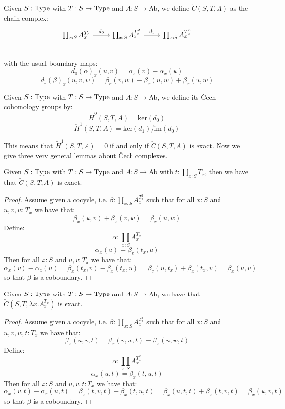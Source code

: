 \begin{definition}
Given $S:\mathrm{Type}$ with $T:S\to \mathrm{Type}$ and $A:S\to\mathrm{Ab}$, we define $\check{C}(S,T,A)$ as the chain complex:
\begin{equation}
\begin{tikzcd}
     \prod_{x:S}A_x^{T_x} \ar[r,"d_0"] & \prod_{x:S}A_x^{T_x^2}\ar[r,"d_1"] &  \prod_{x:S}A_x^{T_x^3}\\
\end{tikzcd}
\end{equation}
with the usual boundary maps:
\[d_0(\alpha)_x(u,v) = \alpha_x(v)-\alpha_x(u)\]
\[d_1(\beta)_x(u,v,w) = \beta_x(v,w) - \beta_x(u,w) + \beta_x(u,w)\]
\end{definition}

\begin{definition}
Given $S:\mathrm{Type}$ with $T:S\to \mathrm{Type}$ and $A:S\to\mathrm{Ab}$, we define its \v{C}ech cohomology groups by:
\[\check{H}^0(S,T,A) = \mathrm{ker}(d_0)\]
\[\check{H}^1(S,T,A) = \mathrm{ker}(d_1)/\mathrm{im}(d_0)\]
\end{definition}

This means that $\check{H}^1(S,T,A) = 0$ if and only if $\check{C}(S,T,A)$ is exact. Now we give three very general lemmas about \v{C}ech complexes.

\begin{lemma}\label{section-exact-cech-complex}
Given $S:\mathrm{Type}$ with $T:S\to \mathrm{Type}$ and $A:S\to\mathrm{Ab}$ with $t:\prod_{x:S}T_x$, then we have that $\check{C}(S,T,A)$ is exact.
\end{lemma}

\begin{proof}
Assume given a cocycle, i.e. $\beta:\prod_{x:S}A_x^{T_x^2}$ such that for all $x:S$ and $u,v,w:T_x$ we have that:
\[\beta_x(u,v)+\beta_x(v,w) = \beta_x(u,w)\]
Define:
\[\alpha:\prod_{x:S}A_x^{T_x}\]
\[\alpha_x(u) = \beta_x(t_x,u)\]
Then for all $x:S$ and $u,v:T_x$ we have that:
\[\alpha_x(v)-\alpha_x(u) = \beta_x(t_x,v) - \beta_x(t_x,u) = \beta_x(u,t_x)+\beta_x(t_x,v) = \beta_x(u,v)\]
so that $\beta$ is a coboundary.
\end{proof}

\begin{lemma}\label{canonical-exact-cech-complex}
Given $S:\mathrm{Type}$ with $T:S\to \mathrm{Type}$ and $A:S\to\mathrm{Ab}$, we have that $\check{C}(S,T,\lambda x.A_x^{T_x})$ is exact.
\end{lemma}

\begin{proof}
Assume given a cocycle, i.e. $\beta:\prod_{x:S}A_x^{T_x^3}$ such that for all $x:S$ and $u,v,w,t:T_x$ we have that:
\[\beta_x(u,v,t)+\beta_x(v,w,t) = \beta_x(u,w,t)\]
Define:
\[\alpha:\prod_{x:S}A_x^{T_x^2}\]
\[\alpha_x(u,t) = \beta_x(t,u,t)\]
Then for all $x:S$ and $u,v,t:T_x$ we have that:
\[\alpha_x(v,t)-\alpha_x(u,t) = \beta_x(t,v,t) - \beta_x(t,u,t) = \beta_x(u,t,t)+\beta_x(t,v,t) = \beta_x(u,v,t)\]
so that $\beta$ is a coboundary.
\end{proof}

